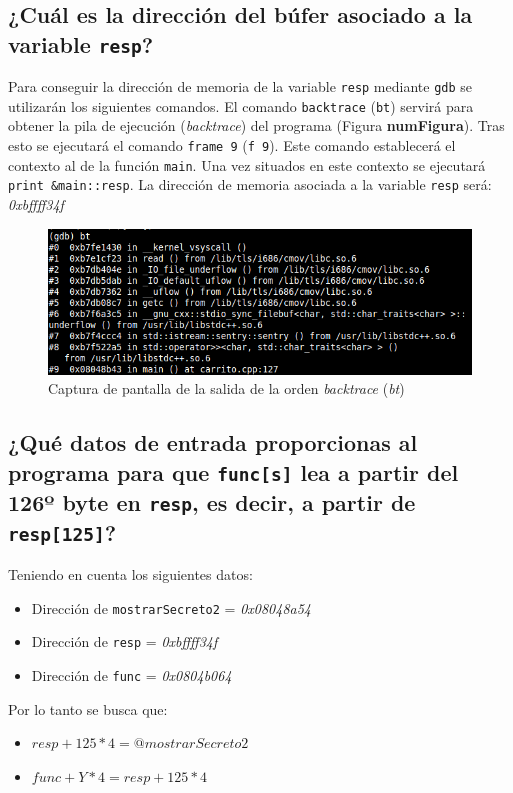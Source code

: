 \documentclass[10pt,a4paper]{article}
\begin{document}
\subsection{¿Cuál es la dirección del búfer asociado a la variable \texttt{resp}?}

Para conseguir la dirección de memoria de la variable \texttt{resp} mediante \texttt{gdb} se utilizarán los siguientes comandos. El comando \texttt{backtrace} (\texttt{bt}) servirá para obtener la pila de ejecución (\emph{backtrace}) del programa (Figura \textbf{numFigura}). Tras esto se ejecutará el comando \texttt{frame 9} (\texttt{f 9}). Este comando establecerá el contexto al de la función \texttt{main}. Una vez situados en este contexto se ejecutará \texttt{print \&{}main::resp}. La dirección de memoria asociada a la variable \texttt{resp} será: \emph{0xbffff34f}\\

\begin{figure}[h!]
\centering
\includegraphics[scale=0.8]{images/bt.png}
\caption{Captura de pantalla de la salida de la orden \emph{backtrace} (\emph{bt})}
\label{fig:bt}
\end{figure}


\subsection{¿Qué datos de entrada proporcionas al programa para que \texttt{func[s]} lea a partir del 126º byte en \texttt{resp}, es decir, a partir de \texttt{resp[125]}?}

Teniendo en cuenta los siguientes datos:
\begin{itemize}
\item Dirección de \texttt{mostrarSecreto2} = \emph{0x08048a54}
\item Dirección de \texttt{resp} = \emph{0xbffff34f}
\item Dirección de \texttt{func} = \emph{0x0804b064}
\end{itemize}


Por lo tanto se busca que:
\begin{itemize}
\item $resp + 125*4 = @mostrarSecreto2$
\item $func + Y*4 = resp + 125*4$
\end{itemize}
\end{document}
